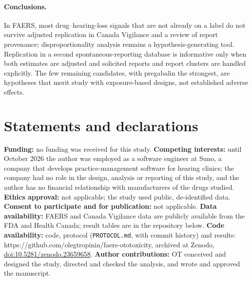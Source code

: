 \documentclass[11pt]{article}
\begin{document}
\paragraph{Conclusions.} In FAERS, most drug--hearing-loss signals that are not already on a label do not survive adjusted
replication in Canada Vigilance and a review of report provenance; disproportionality analysis remains a
hypothesis-generating tool. Replication in a second spontaneous-reporting database is informative only when both estimates are
adjusted and solicited reports and report clusters are handled explicitly. The few remaining candidates, with pregabalin the
strongest, are hypotheses that merit study with exposure-based designs, not established adverse effects.

\section*{Statements and declarations}
\textbf{Funding:} no funding was received for this study.
\textbf{Competing interests:} until October 2026 the author was employed as a software engineer at Suno, a company that develops practice-management software for hearing clinics; the company had no role in the design, analysis or reporting of this study, and the author has no financial relationship with manufacturers of the drugs studied.
\textbf{Ethics approval:} not applicable; the study used public, de-identified data.
\textbf{Consent to participate and for publication:} not applicable.
\textbf{Data availability:} FAERS and Canada Vigilance data are publicly available from the FDA and Health Canada; result
tables are in the repository below.
\textbf{Code availability:} code, protocol (\texttt{PROTOCOL.md}, with commit history) and results: https://github.com/olegtropinin/faers-ototoxicity, archived at Zenodo,
\href{https://doi.org/10.5281/zenodo.23659658}{doi:10.5281/zenodo.23659658}.
\textbf{Author contributions:} OT conceived and designed the study, directed and checked the analysis, and wrote and approved
the manuscript.



\end{document}
